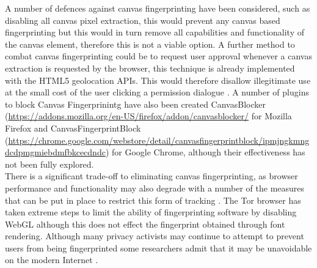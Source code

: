 \documentclass[12pt]{article}
\begin{document}
A number of defences against canvas fingerprinting have been considered, such as disabling all canvas pixel extraction, this would prevent any canvas based fingerprinting but this would in turn remove all capabilities and functionality of the canvas element, therefore this is not a viable option. A further method to combat canvas fingerprinting could be to request user approval whenever a canvas extraction is requested by the browser, this technique is already implemented with the HTML5 geolocation APIs. This would therefore disallow illegitimate use at the small cost of the user clicking a permission dialogue \parencite{canvasFP}. A number of plugins to block Canvas Fingerprinintg have also been created CanvasBlocker (\url{https://addons.mozilla.org/en-US/firefox/addon/canvasblocker/} for Mozilla Firefox and CanvasFingerprintBlock (\url{https://chrome.google.com/webstore/detail/canvasfingerprintblock/ipmjngkmngdcdpmgmiebdmfbkcecdndc}) for Google Chrome, although their effectiveness has not been fully explored. \\  

There is a significant trade-off to eliminating canvas fingerprinting, as browser performance and functionality may also degrade with a number of the measures that can be put in place to restrict this form of tracking \parencite{canvasFP}. The Tor browser has taken extreme steps to limit the ability of fingerprinting software by disabling WebGL although this does not effect the fingerprint obtained through font rendering. Although many privacy activists may continue to attempt to prevent users from being fingerprinted some researchers admit that it may be unavoidable on the modern Internet \parencite{canvasFP}.

\end{document}
